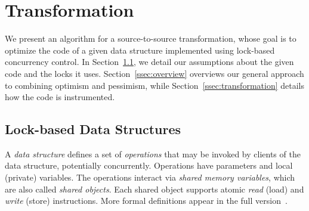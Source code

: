 \renewcommand{\ttdefault}{pcr}
\algrenewcommand{}
\algrenewcommand{}
\algrenewcommand{}
\algrenewcommand{}
\algrenewcommand{}
\algrenewcommand\textproc{\textit}
\newcommand{\codesize}{\footnotesize}



\section{Transformation}\label{sec:algorithm}

We present an algorithm for a source-to-source transformation, whose
goal is to optimize the code of a given data structure implemented using lock-based concurrency control.
In Section~\ref{ssec:locks}, we detail our assumptions about the given code and the locks it uses.
Section~\ref{ssec:overview} overviews our general approach to combining optimism and pessimism,
while
Section~\ref{ssec:transformation} details how the code is instrumented. 

\subsection{Lock-based Data Structures}\label{ssec:locks}

A \emph{data structure} defines a set of \emph{operations} that may be invoked by
clients of the data structure, potentially concurrently.
%
Operations have parameters and local (private) variables. %
%
The operations interact via \emph{shared memory variables}, which are also called \emph{shared objects}.
%
Each shared object supports atomic \emph{read} (load) and \emph{write} (store) instructions.
%
More formal definitions appear in the full version~\cite{}. 

